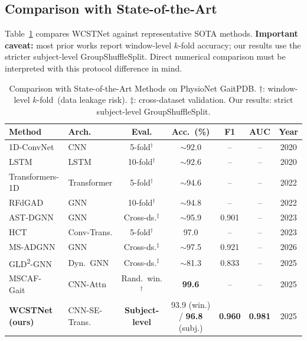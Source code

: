 \documentclass[lettersize,journal]{IEEEtran}
\begin{document}
\subsection{Comparison with State-of-the-Art}
\label{sec:compare}

Table~\ref{tab:sota} compares WCSTNet against representative SOTA
methods.
\textbf{Important caveat:} most prior works report window-level
$k$-fold accuracy; our results use the stricter subject-level
GroupShuffleSplit.
Direct numerical comparison must be interpreted with this protocol
difference in mind.

\begin{table}[t]
\caption{Comparison with State-of-the-Art Methods on PhysioNet GaitPDB.
$\dagger$: window-level $k$-fold~(data leakage risk).
$\ddagger$: cross-dataset validation.
Our results: strict subject-level GroupShuffleSplit.}
\label{tab:sota}
\centering
\renewcommand{\arraystretch}{1.2}
\begin{tabular}{llccccc}
\toprule
\textbf{Method} & \textbf{Arch.} & \textbf{Eval.} &
\textbf{Acc.~(\%)} & \textbf{F1} & \textbf{AUC}
& \textbf{Year} \\
\midrule
1D-ConvNet~\cite{maachi2020convnet}
  & CNN & 5-fold$^\dagger$ & $\sim$92.0 & -- & -- & 2020 \\
LSTM~\cite{salimibab2020lstm}
  & LSTM & 10-fold$^\dagger$ & $\sim$92.6 & -- & -- & 2020 \\
Transformers-1D~\cite{nguyen2022transformer}
  & Transformer & 5-fold$^\dagger$ & $\sim$94.6 & -- & -- & 2022 \\
RFdGAD~\cite{zhong2022rfdgad}
  & GNN & 10-fold$^\dagger$ & $\sim$94.8 & -- & -- & 2022 \\
AST-DGNN~\cite{wang2023astdgnn}
  & GNN & Cross-ds.$^\ddagger$ & $\sim$95.9 & 0.901 & -- & 2023 \\
HCT~\cite{naimi2023hct}
  & Conv-Trans. & 5-fold$^\dagger$ & 97.0 & -- & -- & 2023 \\
MS-ADGNN~\cite{wang2026msadgnn}
  & GNN & Cross-ds.$^\ddagger$ & $\sim$97.5 & 0.921 & -- & 2026 \\
GLD\textsuperscript{2}-GNN~\cite{wang2025gld2gnn}
  & Dyn.\ GNN & Cross-ds.$^\ddagger$ & $\sim$81.3 & 0.833 & -- & 2025 \\
MSCAF-Gait~\cite{yuan2025mscaf}
  & CNN-Attn & Rand.\ win.$^\dagger$ & \textbf{99.6} & -- & -- & 2025 \\
\midrule
\textbf{WCSTNet (ours)}
  & CNN-SE-Trans. & \textbf{Subject-level}
  & 93.9 (win.) / \textbf{96.8} (subj.)
  & \textbf{0.960} & \textbf{0.981} & 2025 \\
\bottomrule
\end{tabular}
\end{table}
\end{document}

